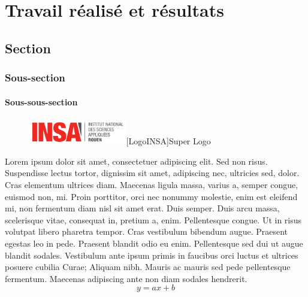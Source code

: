 \documentclass[a4paper, 12pt]{report} %
\begin{document}
	\chapter{Travail réalisé et résultats}

		\section{Section}

			\subsection{Sous-section}

				\subsubsection{Sous-sous-section}


\begin{figure}[h]
\centering
\vspace{-0.6cm} 
\includegraphics[width=43mm]{images/insalogo2.png}[LogoINSA]{Super Logo}
\end{figure}



	Lorem ipsum dolor sit amet, consectetuer adipiscing elit. Sed non risus. Suspendisse lectus tortor, dignissim sit amet, adipiscing nec, ultricies sed, dolor. Cras elementum ultrices diam. Maecenas ligula massa, varius a, semper congue, euismod non, mi. Proin porttitor, orci nec nonummy molestie, enim est eleifend mi, non fermentum diam nisl sit amet erat. Duis semper. Duis arcu massa, scelerisque vitae, consequat in, pretium a, enim. Pellentesque congue. Ut in risus volutpat libero pharetra tempor. Cras vestibulum bibendum augue. Praesent egestas leo in pede. Praesent blandit odio eu enim. Pellentesque sed dui ut augue blandit sodales. Vestibulum ante ipsum primis in faucibus orci luctus et ultrices posuere cubilia Curae; Aliquam nibh. Mauris ac mauris sed pede pellentesque fermentum. Maecenas adipiscing ante non diam sodales hendrerit.\\

\begin{equation}
	y = a x + b
\end{equation}
\end{document}
